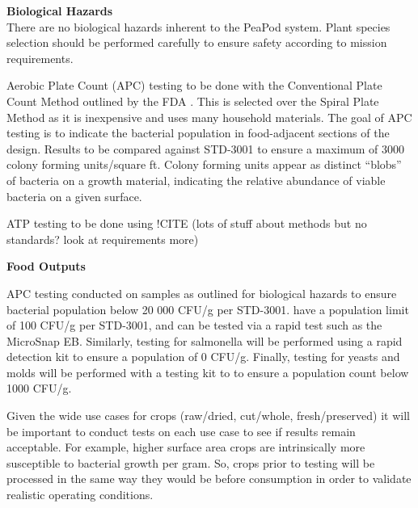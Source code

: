 
\textbf{Biological Hazards}\\
There are no biological hazards inherent to the PeaPod system. Plant species selection should be performed carefully to ensure safety according to mission requirements.

Aerobic Plate Count (APC) testing to be done with the Conventional Plate Count Method outlined by the FDA \cite{platecount}. This is selected over the Spiral Plate Method as it is inexpensive and uses many household materials. The goal of APC testing is to indicate the bacterial population in food-adjacent sections of the design. Results to be compared against STD-3001 to ensure a maximum of 3000 colony forming units/square ft. Colony forming units appear as distinct ``blobs'' of bacteria on a growth material, indicating the relative abundance of viable bacteria on a given surface.

ATP testing to be done using !CITE (lots of stuff about methods but no standards? look at requirements more)

\textbf{Food Outputs}

APC testing conducted on samples as outlined for biological hazards to ensure bacterial population below 20 000 CFU/g per STD-3001.  have a population limit of 100 CFU/g per STD-3001, and can be tested via a rapid test such as the MicroSnap EB. Similarly, testing for salmonella will be performed using a rapid detection kit to ensure a population of 0 CFU/g. Finally, testing for yeasts and molds will be performed with a testing kit to to ensure a population count below 1000 CFU/g.

Given the wide use cases for crops (raw/dried, cut/whole, fresh/preserved) it will be important to conduct tests on each use case to see if results remain acceptable. For example, higher surface area crops are intrinsically more susceptible to bacterial growth per gram. So, crops prior to testing will be processed in the same way they would be before consumption in order to validate realistic operating conditions.


